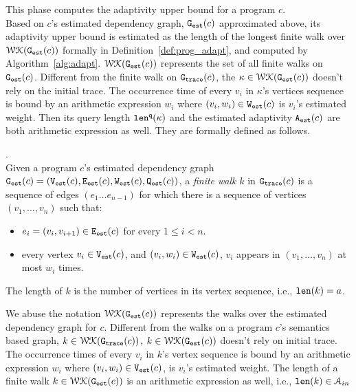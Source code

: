 This phase computes the adaptivity upper bound for a program $c$.
\\
Based on
$c$'s estimated dependency graph, $\mathtt{{G_{est}}}({c})$ approximated above,
%
its adaptivity upper bound 
%
is estimated as
the length of the longest finite walk over $\mathcal{WK}(\mathtt{{G_{est}}}({c}))$ formally in Definition~\ref{def:prog_adapt}, 
and computed 
by Algorithm~\ref{alg:adapt}.
%
$\mathcal{WK}(\mathtt{{G_{est}}}(c))$ represents the set of all finite walks on
 $\mathtt{{G_{est}}}({c})$.
Different from the finite walk on $\mathtt{{G_{trace}}}(c)$, the $\kappa \in \mathcal{WK}(\mathtt{{G_{est}}}(c))$ doesn't rely on the initial trace.
The occurrence time of every $v_i$ in $\kappa$'s vertices sequence is bound by 
an arithmetic expression $w_i$ where $(v_i, w_i) \in \mathtt{{W_{est}}}(c)$ is $v_i$'s estimated weight.
Then its query length $\mathtt{len}^{\tt q}(\kappa)$ and the estimated adaptivity ${\mathtt{A_{est}}}(c)$ are both arithmetic expression as well.
%
They are formally defined as follows.
\begin{defn}.
  \label{def:prog_finitewalk}
  \\
  Given a program $c$'s estimated dependency graph 
  $\mathtt{{G_{est}}}({c}) = (\mathtt{{V_{est}}}(c), \mathtt{{E_{est}}}(c), \mathtt{{W_{est}}}(c), \mathtt{{Q_{est}}}(c))$, 
  a \emph{finite walk} $k$ in $\mathtt{{G_{trace}}}({c})$ is
  a sequence of edges $(e_1 \ldots e_{n - 1})$ 
  for which there is a sequence of vertices 
  $(v_1, \ldots, v_{n})$ such that:
  \begin{itemize}
      \item $e_i = (v_{i},v_{i + 1}) \in \mathtt{{E_{est}}}(c)$ for every $1 \leq i < n$.
      \item every vertex $v_i \in \mathtt{{V_{est}}}(c)$,
      and $(v_i, w_i) \in \mathtt{{W_{est}}}(c)$, 
       $v_i$ appears in $(v_1, \ldots, v_{n})$ at most 
    $w_i$
      times.  
  \end{itemize}
  The length of $k$ is the number of vertices in its vertex sequence, i.e., $\mathtt{len}(k) = a$.
 \end{defn}
We abuse the notation $\mathcal{WK}(\mathtt{{G_{est}}}(c))$ represents the walks over the estimated dependency graph for $c$.
Different from the walks on a program $c$'s semantics based graph,
 $k \in \mathcal{WK}(\mathtt{{G_{trace}}}(c))$, 
$k \in \mathcal{WK}(\mathtt{{G_{est}}}(c))$ doesn't rely on initial trace.
The occurrence times of every $v_i $ in $k$'s vertex sequence is bound by 
an arithmetic expression $w_i$ where $(v_i, w_i) \in \mathtt{{V_{est}}}(c)$, is $v_i$'s estimated weight. 
 The length of a finite walk $k \in \mathcal{WK}(\mathtt{{G_{est}}}(c))$ is an arithmetic expression
 as well, i.e., $\mathtt{len}(k) \in \mathcal{A}_{in}$

